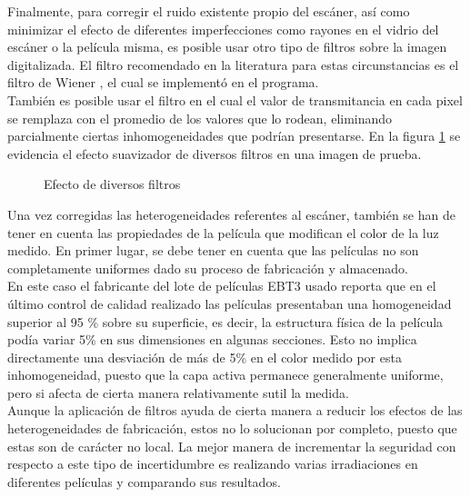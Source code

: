 Finalmente, para corregir el ruido existente propio del escáner, así como minimizar el efecto de diferentes imperfecciones como rayones en el vidrio del escáner o la película misma, es posible usar otro tipo de filtros sobre la imagen digitalizada. El filtro recomendado en la literatura para estas circunstancias es el filtro de Wiener \cite{Devic2016}, el cual se implementó en el programa. \\

También es posible usar el filtro en el cual el valor de transmitancia en cada pixel se remplaza con el promedio de los valores que lo rodean, eliminando parcialmente ciertas inhomogeneidades que podrían presentarse. En la figura \ref{fig:filtros} se evidencia el efecto suavizador de diversos filtros en una imagen de prueba. \\
\begin{figure}
	\centering
	
	\caption{Efecto de diversos filtros}
	\label{fig:filtros}
\end{figure}

Una vez corregidas las heterogeneidades referentes al escáner, también se han de tener en cuenta las propiedades de la película que modifican el color de la luz medido. En primer lugar, se debe tener en cuenta que las películas no son completamente uniformes dado su proceso de fabricación y almacenado.\\

En este caso el fabricante del lote de películas EBT3 usado reporta que en el último control de calidad realizado las películas presentaban una homogeneidad superior al 95 \% sobre su superficie, es decir, la estructura física de la película podía variar 5\% en sus dimensiones en algunas secciones. Esto no implica directamente una desviación de más de 5\% en el color medido por esta inhomogeneidad, puesto que la capa activa permanece generalmente uniforme, pero si afecta de cierta manera relativamente sutil la medida. \\ 

Aunque la aplicación de filtros ayuda de cierta manera a reducir los efectos de las heterogeneidades de fabricación, estos no lo solucionan por completo, puesto que estas son de carácter no local. La mejor manera de incrementar la seguridad con respecto a este tipo de incertidumbre es realizando varias irradiaciones en  diferentes películas y comparando sus resultados.\\


